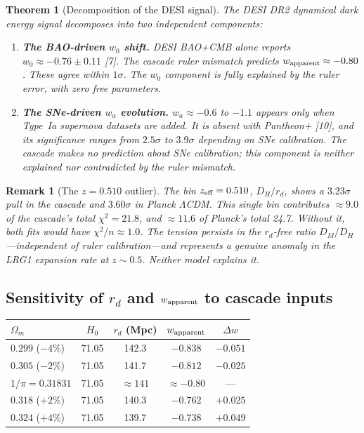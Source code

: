 \documentclass[12pt,a4paper]{article}
\newtheorem{theorem}{Theorem}[section]
\newtheorem*{remark}{Remark}
\begin{document}
\begin{theorem}[Decomposition of the DESI signal]
The DESI DR2 dynamical dark energy signal decomposes into two independent components:
\begin{enumerate}
\item \textbf{The BAO-driven $w_0$ shift.} DESI BAO+CMB alone reports
$w_0 \approx -0.76 \pm 0.11$ [7]. The cascade ruler mismatch predicts
$w_{\rm apparent} \approx -0.80$. These agree within $1\sigma$. The $w_0$ component
is fully explained by the ruler error, with zero free parameters.
\item \textbf{The SNe-driven $w_a$ evolution.} $w_a \approx -0.6$ to $-1.1$ appears only
when Type~Ia supernova datasets are added. It is absent with Pantheon+ [10], and
its significance ranges from $2.5\sigma$ to $3.9\sigma$ depending on SNe calibration.
The cascade makes no prediction about SNe calibration; this component is neither
explained nor contradicted by the ruler mismatch.
\end{enumerate}
\end{theorem}

\begin{remark}[The $z = 0.510$ outlier]\label{rem:outlier}
The bin $z_{\rm eff} = 0.510$, $D_H/r_d$, shows a $3.23\sigma$ pull in the cascade and
$3.60\sigma$ in Planck $\Lambda$CDM. This single bin contributes $\approx 9.0$ of the
cascade's total $\chi^2 = 21.8$, and $\approx 11.6$ of Planck's total 24.7. Without it,
both fits would have $\chi^2/n \approx 1.0$. The tension persists in the $r_d$-free ratio
$D_M/D_H$---independent of ruler calibration---and represents a genuine anomaly in the
LRG1 expansion rate at $z \sim 0.5$. Neither model explains it.
\end{remark}

\subsection{Sensitivity of $r_d$ and $w_{\rm apparent}$ to cascade inputs}

\begin{center}
\begin{tabular}{lcccc}
\hline
$\Omega_m$ & $H_0$ & $r_d$ (Mpc) & $w_{\rm apparent}$ & $\Delta w$ \\
\hline
$0.299$ ($-4\%$) & 71.05 & 142.3 & $-0.838$ & $-0.051$ \\
$0.305$ ($-2\%$) & 71.05 & 141.7 & $-0.812$ & $-0.025$ \\
$1/\pi = 0.31831$ & 71.05 & $\approx141$ & $\approx-0.80$ & --- \\
$0.318$ ($+2\%$) & 71.05 & 140.3 & $-0.762$ & $+0.025$ \\
$0.324$ ($+4\%$) & 71.05 & 139.7 & $-0.738$ & $+0.049$ \\
\hline
\end{tabular}
\end{center}
\end{document}
